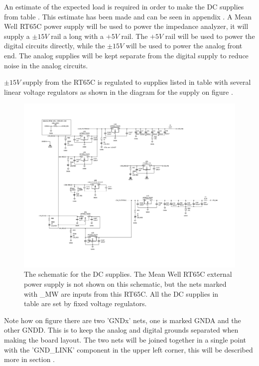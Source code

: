 An estimate of the expected load is required in order to make the DC supplies from table . This estimate has been made and can be seen in appendix . A Mean Well RT65C\cite{RT65C} power supply will be used to power the impedance analyzer, it will supply a $\pm 15V$ rail a long with a $+5V$ rail. The $+5V$ rail will be used to power the digital circuits directly, while the $\pm 15V$ will be used to power the analog front end. The analog supplies will be kept separate from the digital supply to reduce noise in the analog circuits.

$\pm 15V$ supply from the RT65C is regulated to supplies listed in table  with several linear voltage regulators as shown in the diagram for the supply on figure .

\begin{figure}[H]
    \centering
    \includegraphics[clip, trim=0 50 0 0, width=1\textwidth]{Appendix/Figures/A_SCH_DCSUPPLY.pdf}
    \caption{The schematic for the DC supplies. The Mean Well RT65C external power supply is not shown on this schematic, but the nets marked with \_MW are inputs from this RT65C. All the DC supplies in table  are set by fixed voltage regulators.}
    \label{fig_7_1_6_DCSUPPLY}
\end{figure}

Note how on figure  there are two 'GNDx' nets, one is marked GNDA and the other GNDD. This is to keep the analog and digital grounds separated when making the board layout. The two nets will be joined together in a single point with the 'GND\_LINK' component in the upper left corner, this will be described more in section .

